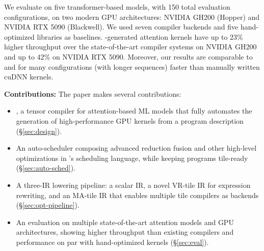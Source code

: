 We evaluate \NAME{} on five 
transformer-based models, with {150} total evaluation configurations, on two
modern GPU architectures: NVIDIA GH200 (Hopper) and NVIDIA RTX 5090 (Blackwell). We used
seven compiler backends and five hand-optimized libraries as baselines. \NAME{}-generated
attention kernels have up to 23\% higher throughput over the
state-of-the-art compiler systems on NVIDIA GH200 and up to 42\% on NVIDIA RTX 5090.
Moreover, our results are comparable to and for many configurations (with longer sequences)
faster than manually written cuDNN kernels.

\vspace{0.3em}
\noindent\textbf{Contributions:} The paper makes several contributions:
\begin{itemize}
  \item \NAME{}, a tensor compiler for attention-based ML models that fully automates the
    generation of high-per\-for\-mance GPU kernels from a program description (\S\ref{sec:design}).
  \item An auto-scheduler composing advanced reduction fusion and other high-level
    optimizations in \NAME{}'s scheduling language, while keeping programs tile-ready
    (\S\ref{sec:auto-sched}).
  \item A three-IR lowering pipeline: a scalar IR, a novel VR-tile IR for expression
    rewriting, and an MA-tile IR that enables multiple tile compilers as backends
    (\S\ref{sec:opt-pipeline}).
  \item An evaluation on multiple state-of-the-art attention models and GPU architectures,
    showing higher throughput than existing compilers and performance on par with
    hand-optimized kernels (\S\ref{sec:eval}).
\end{itemize}
